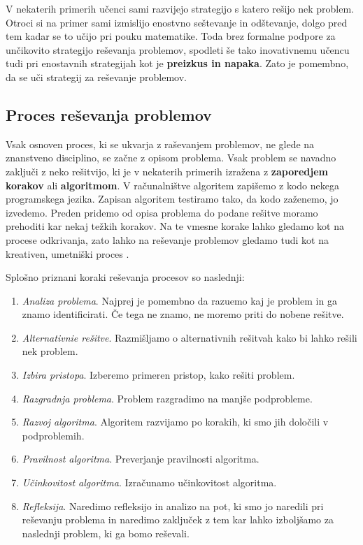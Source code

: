 V nekaterih primerih učenci sami razvijejo strategijo s katero rešijo
nek problem. Otroci si na primer sami izmislijo enostvno seštevanje in
odštevanje, dolgo pred tem kadar se to učijo pri pouku
matematike. Toda brez formalne podpore za unčikovito strategijo
reševanja problemov, spodleti še tako inovativnemu učencu tudi pri
enostavnih strategijah kot je \textbf{preizkus in napaka}. Zato je
pomembno, da se uči strategij za reševanje problemov.

\subsection{Proces reševanja problemov}
\label{sec:proces_reševanja_problemov}

Vsak osnoven proces, ki se ukvarja z raševanjem problemov, ne glede na
znanstveno disciplino, se začne z opisom problema. Vsak problem se
navadno zaključi z neko rešitvijo, ki je v nekaterih primerih izražena
z \textbf{zaporedjem korakov} ali \textbf{algoritmom}. V računalništve
algoritem zapišemo z kodo nekega programskega jezika. Zapisan
algoritem testiramo tako, da kodo zaženemo, jo izvedemo. Preden
pridemo od opisa problema do podane rešitve moramo prehoditi kar nekaj
težkih korakov. Na te vmesne korake lahko gledamo kot na procese
odkrivanja, zato lahko na reševanje problemov gledamo tudi kot na
kreativen, umetniški proces \cite{guideTCS}.

Splošno priznani koraki reševanja procesov so naslednji:

\begin{enumerate}
\tightlist
\item \emph{Analiza problema}. Najprej je pomembno da razuemo kaj je
  problem in ga znamo identificirati. Če tega ne znamo, ne moremo
  priti do nobene rešitve.
\item \emph{Alternativnie rešitve}. Razmišljamo o alternativnih
  rešitvah kako bi lahko rešili nek problem.
\item \emph{Izbira pristopa}. Izberemo primeren pristop, kako rešiti problem.
\item \emph{Razgradnja problema}. Problem razgradimo na manjše podprobleme.
\item \emph{Razvoj algoritma}. Algoritem razvijamo po korakih, ki smo
  jih določili v podproblemih.
\item \emph{Pravilnost algoritma}. Preverjanje pravilnosti algoritma.
\item \emph{Učinkovitost algoritma}. Izračunamo učinkovitost algoritma.
\item \emph{Refleksija}. Naredimo refleksijo in analizo na pot, ki smo
  jo naredili pri reševanju problema in naredimo zaključek z tem kar
  lahko izboljšamo za naslednji problem, ki ga bomo reševali.
\end{enumerate}


